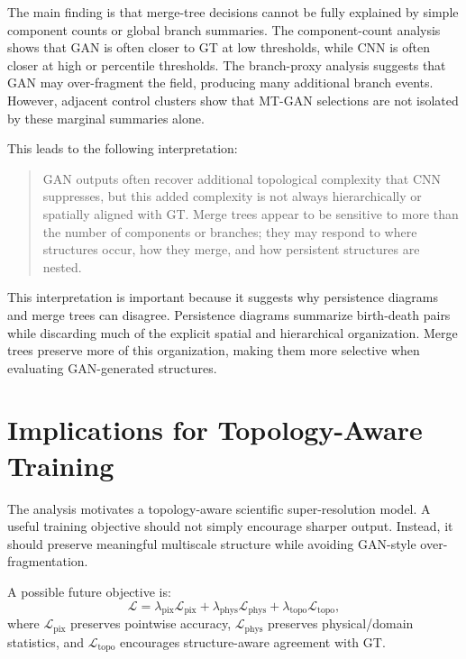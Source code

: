 \documentclass[10pt,conference]{IEEEtran}
\begin{document}
The main finding is that merge-tree decisions cannot be fully explained by simple
component counts or global branch summaries. The component-count analysis shows that
GAN is often closer to GT at low thresholds, while CNN is often closer at high or
percentile thresholds. The branch-proxy analysis suggests that GAN may over-fragment
the field, producing many additional branch events. However, adjacent control clusters
show that MT-GAN selections are not isolated by these marginal summaries alone.

This leads to the following interpretation:
\begin{quote}
GAN outputs often recover additional topological complexity that CNN suppresses, but
this added complexity is not always hierarchically or spatially aligned with GT.
Merge trees appear to be sensitive to more than the number of components or branches;
they may respond to where structures occur, how they merge, and how persistent
structures are nested.
\end{quote}

This interpretation is important because it suggests why persistence diagrams and
merge trees can disagree. Persistence diagrams summarize birth-death pairs while
discarding much of the explicit spatial and hierarchical organization. Merge trees
preserve more of this organization, making them more selective when evaluating
GAN-generated structures.


\section{Implications for Topology-Aware Training}

The analysis motivates a topology-aware scientific super-resolution model. A useful
training objective should not simply encourage sharper output. Instead, it should
preserve meaningful multiscale structure while avoiding GAN-style over-fragmentation.

A possible future objective is:
\begin{equation}
\mathcal{L}
=
\lambda_{\mathrm{pix}}\mathcal{L}_{\mathrm{pix}}
+
\lambda_{\mathrm{phys}}\mathcal{L}_{\mathrm{phys}}
+
\lambda_{\mathrm{topo}}\mathcal{L}_{\mathrm{topo}},
\end{equation}
where $\mathcal{L}_{\mathrm{pix}}$ preserves pointwise accuracy,
$\mathcal{L}_{\mathrm{phys}}$ preserves physical/domain statistics, and
$\mathcal{L}_{\mathrm{topo}}$ encourages structure-aware agreement with GT.
\end{document}
